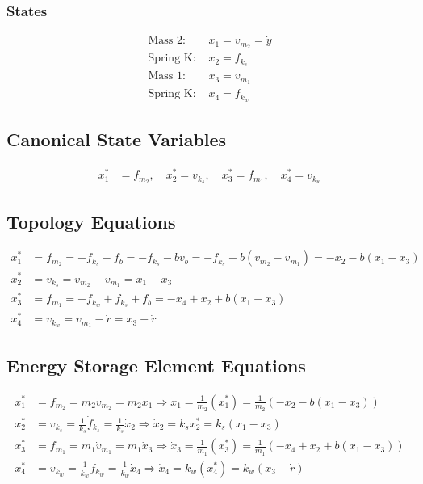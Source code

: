 \documentclass{article}
\begin{document}
\subsubsection{States}
\begin{align*}
\text{Mass 2: } & x_1 = v_{m_2} = \dot{y} \\
\text{Spring K: } & x_2 = f_{k_s} \\
\text{Mass 1: } & x_3 = v_{m_1} \\
\text{Spring K: } & x_4 = f_{k_w}
\end{align*}

\subsection{Canonical State Variables}
\begin{align*}
x^*_1 &= f_{m_2}, \quad x^*_2 = v_{k_s}, \quad x^*_3 = f_{m_1}, \quad x^*_4 = v_{k_w}
\end{align*}

\subsection{Topology Equations}
\begin{align*}
x^*_1 &= f_{m_2} = -f_{k_s} - f_b = -f_{k_s} - bv_b = -f_{k_s} - b(v_{m_2} - v_{m_1}) = -x_2 - b(x_1 - x_3) \\
x^*_2 &= v_{k_s} = v_{m_2} - v_{m_1} = x_1 - x_3 \\
x^*_3 &= f_{m_1} = -f_{k_w} + f_{k_s} + f_b = -x_4 + x_2 + b(x_1 - x_3)\\
x^*_4 &= v_{k_w} = v_{m_1} - \dot{r} = x_3 - \dot{r}
\end{align*}

\subsection{Energy Storage Element Equations}
\begin{align*}
x^*_1 &= f_{m_2} = m_2 \dot{v}_{m_2} = m_2 \dot{x}_1 \Rightarrow \dot{x}_1 = \frac{1}{m_2} (x_1^*) = \frac{1}{m_2} (-x_2 - b(x_1-x_3)) \\
x^*_2 &= v_{k_s} = \frac{1}{k_s} \dot{f}_{k_s} = \frac{1}{k_s} \dot{x}_2 \Rightarrow \dot{x}_2 = k_s x^*_2 = k_s (x_1 - x_3) \\
x^*_3 &= f_{m_1} = m_1 \dot{v}_{m_1} = m_1 \dot{x}_3 \Rightarrow \dot{x}_3 = \frac{1}{m_1} (x_3^*) = \frac{1}{m_1} (-x_4 + x_2 + b(x_1 - x_3)) \\
x^*_4 &= v_{k_w} = \frac{1}{k_w} \dot{f}_{k_w} = \frac{1}{k_w} \dot{x}_4 \Rightarrow \dot{x}_4 = k_w(x^*_4) = k_w (x_3 - \dot{r})
\end{align*}
\end{document}
